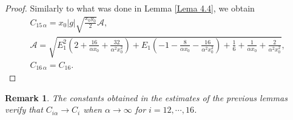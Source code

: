 \documentclass[11pt]{article}
\newtheorem{Remark}{Remark}
\begin{document}
   \begin{proof} Similarly to what was done in Lemma \ref{Lema 4.4}, we obtain
   $$\begin{array}{c}
   C_{15\, \alpha}=x_0  |g|  \sqrt{\tfrac{x_0 y_0}{2}} \mathcal{A}, \\[0.45cm]
  \mathcal{A}= \sqrt{E_1^2\left(2+\tfrac{16}{\alpha x_0}+\tfrac{32}{\alpha^2x_0^2} \right)+E_1\left(-1-\tfrac{8}{\alpha x_0}-\tfrac{16}{\alpha^2 x_0^2} \right)+\tfrac{1}{6}+\tfrac{1}{\alpha x_0}+\tfrac{2}{\alpha^2 x_0^2} },\\[0.45cm]
  C_{16\, \alpha}=C_{16}.
   \end{array}$$
   \end{proof}
\begin{Remark}
The constants obtained in the estimates of the previous lemmas verify that \mbox{$C_{i\alpha}\to C_i$}  when $ \alpha\to\infty$ for $i=12,\cdots,16$.
\end{Remark}
\end{document}
